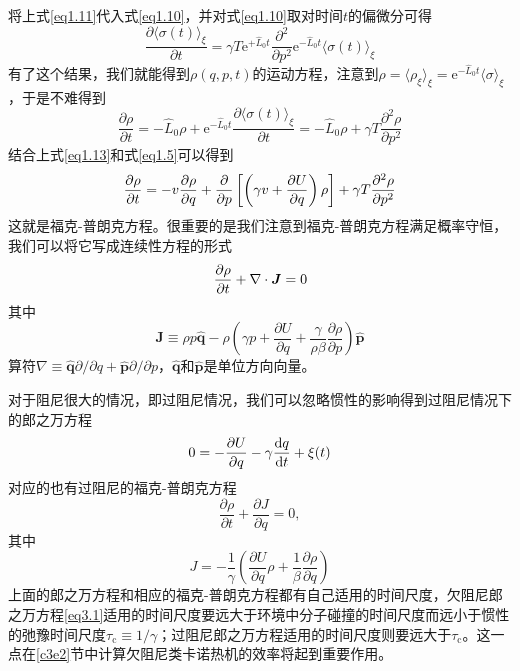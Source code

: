 将上式\eqref{eq1.11}代入式\eqref{eq1.10}，并对式\eqref{eq1.10}取对时间$t$的偏微分可得
\begin{equation}
    \frac{\partial\langle\sigma(t)\rangle_{\xi}}{\partial t}=\gamma T \mathrm{e}^{+\hat{L}_{0} t} \frac{\partial^{2}}{\partial p^{2}} \mathrm{e}^{-\hat{L}_{0} t}\langle\sigma(t)\rangle_{\xi}
    \label{eq1.12}
\end{equation}
有了这个结果，我们就能得到$\rho(q,p,t)$的运动方程，注意到$\rho=\langle\rho_{\xi}\rangle_{\xi}=\mathrm{e}^{-\hat{L}_{0} t} \langle\sigma\rangle_{\xi}$，于是不难得到
\begin{equation}
    \frac{\partial \rho}{\partial t}=-\hat{L}_{0}\rho+\mathrm{e}^{-\hat{L}_{0} t} \frac{\partial\langle\sigma(t)\rangle_{\xi}}{\partial t}=-\hat{L}_{0}\rho+\gamma T \frac{\partial^{2} \rho}{\partial p^{2}}
    \label{eq1.13}
\end{equation}
结合上式\eqref{eq1.13}和式\eqref{eq1.5}可以得到
\begin{equation}
    \frac{\partial \rho}{\partial t}=-v \frac{\partial \rho}{\partial q}+\frac{\partial}{\partial p}\left[\left({\gamma} v+ \frac{\partial U}{\partial q}\right) \rho\right]+\gamma T \frac{\partial^{2} \rho}{\partial p^{2}}
    \label{eq1.14}
\end{equation}
这就是福克-普朗克方程。很重要的是我们注意到福克-普朗克方程满足概率守恒，我们可以将它写成连续性方程的形式
\begin{equation}
    \frac{\partial \rho}{\partial t} + \nabla \cdot \bm{J} = 0
\label{eq12.57}
\end{equation}
其中
\begin{equation}
\bm{J} \equiv \rho  p  \hat{\mathbf{q}}-\rho\left(\gamma p+\frac{\partial U}{\partial q} + \frac{\gamma}{\rho \beta} \frac{\partial \rho}{\partial p}\right) \hat{\mathbf{p}}
\label{eq12.57.5}
\end{equation}
算符$\nabla \equiv \hat{\mathbf{q}} \partial / \partial q+\hat{\mathbf{p}} \partial / \partial p$，$\hat{\mathbf{q}}$和$\hat{\mathbf{p}}$是单位方向向量。

对于阻尼很大的情况，即过阻尼情况，我们可以忽略惯性的影响得到过阻尼情况下的郎之万方程
\begin{equation}
    0=-\frac{\partial U}{\partial q}-\gamma \frac{\mathrm{d} q}{\mathrm{d} t}+\xi(t)
    \label{eq1.17}
\end{equation}
对应的也有过阻尼的福克-普朗克方程
\begin{equation}
    \frac{\partial \rho}{\partial t} + \frac{\partial J}{\partial q}=0,
    \label{eq2.45}
\end{equation}
其中
\begin{equation}
    J=-\frac{1}{\gamma} \left(\frac{\partial U}{\partial q} \rho+\frac{1}{\beta} \frac{\partial \rho}{\partial q}\right)
    \label{eq2.45.5}
\end{equation}
上面的郎之万方程和相应的福克-普朗克方程都有自己适用的时间尺度，欠阻尼郎之万方程\eqref{eq3.1}适用的时间尺度要远大于环境中分子碰撞的时间尺度而远小于惯性的弛豫时间尺度$\tau_{\mathrm{c}}\equiv1/\gamma$；过阻尼郎之万方程适用的时间尺度则要远大于$\tau_{\mathrm{c}}$。\cite{Sekimoto2010}这一点在\ref{c3e2}节中计算欠阻尼类卡诺热机的效率将起到重要作用。

